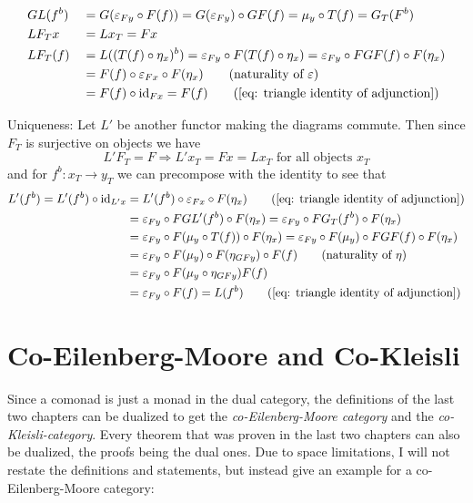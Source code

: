 \begin{beweis}
\begin{itemize1}
\begin{align*}
        &GL(f^b) &&= G(\eps_{Fy} \circ F(f)) = G(\eps_{Fy}) \circ GF(f) = \mu_y \circ T(f) = G_T(F^b) \\
        &LF_Tx &&= Lx_T = Fx \\
        &LF_T(f) &&= L((T(f) \circ \eta_x)^b) 
        = \eps_{Fy} \circ F(T(f) \circ \eta_x) = \eps_{Fy} \circ FGF(f) \circ F(\eta_x) \\
        &&&= F(f) \circ \eps_{Fx} \circ F(\eta_x) \tag{naturality of $\eps$} \\
        &&&= F(f) \circ \id_{Fx} = F(f) \tag{\ref{eq: triangle identity of adjunction}}
    \end{align*}
    \item Uniqueness: Let $L'$ be another functor making the diagrams commute.
    Then since $F_T$ is surjective on objects we have
    \[
        L'F_T = F \Rightarrow L'x_T = Fx = Lx_T \text{ for all objects } x_T
    \]
    and for $f^b \colon x_T \to y_T$ we can precompose with the identity to see that 
    \begin{align*}
        L'(f^b) = L'(f^b) \circ \id_{L'x} &= L'(f^b) \circ \eps_{Fx} \circ F(\eta_x) \tag{\ref{eq: triangle identity of adjunction}} \\
        &= \eps_{Fy} \circ FGL'(f^b) \circ F(\eta_x) 
        = \eps_{Fy} \circ FG_T(f^b) \circ F(\eta_x) \\
        &= \eps_{Fy} \circ F(\mu_y \circ T(f)) \circ F(\eta_x) 
        = \eps_{Fy} \circ F(\mu_y) \circ FGF(f) \circ F(\eta_x) \\
        &= \eps_{Fy} \circ F(\mu_y) \circ F(\eta_{GFy}) \circ F(f) \tag{naturality of $\eta$} \\
        &= \eps_{Fy} \circ F(\mu_y \circ \eta_{GFy}) F(f) \\
        &= \eps_{Fy} \circ F(f) = L(f^b) \tag{\ref{eq: triangle identity of adjunction}}
    \end{align*}  
    \end{itemize1}
\end{beweis}
\section{Co-Eilenberg-Moore and Co-Kleisli}
Since a comonad is just a monad in the dual category, the definitions of the last two chapters can be 
dualized to get the \textit{co-Eilenberg-Moore category} and the \textit{co-Kleisli-category}.
Every theorem that was proven in the last two chapters can also be dualized, the proofs being the dual ones.
Due to space limitations, I will not restate the definitions and statements, but instead give an example for
a co-Eilenberg-Moore category:

